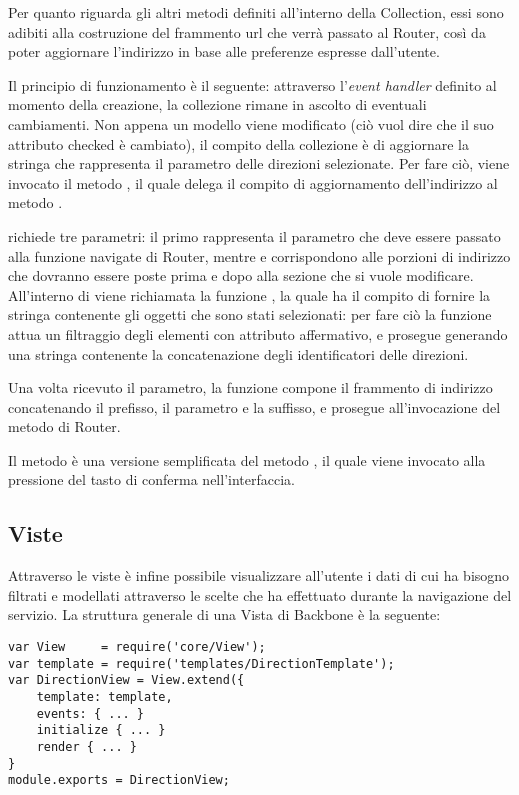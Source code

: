 Per quanto riguarda gli altri metodi definiti all'interno della Collection, essi sono adibiti alla costruzione del frammento url che verrà passato al Router, così da poter aggiornare l'indirizzo in base alle preferenze espresse dall'utente.

Il principio di funzionamento è il seguente: attraverso l'{\itshape event handler} definito al momento della creazione, la collezione rimane in ascolto di eventuali cambiamenti. Non appena un modello viene modificato (ciò vuol dire che il suo attributo checked è cambiato), il compito della collezione è di aggiornare la stringa che rappresenta il parametro delle direzioni selezionate. Per fare ciò, viene invocato il metodo , il quale delega il compito di aggiornamento dell'indirizzo al metodo .

  richiede tre parametri: il primo rappresenta il parametro  che deve essere passato alla funzione navigate di Router, mentre  e  corrispondono alle porzioni di indirizzo che dovranno essere poste prima e dopo alla sezione che si vuole modificare.
 All'interno di  viene richiamata la funzione , la quale ha il compito di fornire la stringa contenente gli oggetti che sono stati selezionati: per fare ciò la funzione attua un filtraggio degli elementi con attributo  affermativo, e prosegue generando una stringa contenente la concatenazione degli identificatori delle direzioni.

 Una volta ricevuto il parametro, la funzione  compone il frammento di indirizzo concatenando il prefisso, il parametro e la suffisso, e prosegue all'invocazione del metodo  di Router.

 Il metodo  è una versione semplificata del metodo , il quale viene invocato alla pressione del tasto di conferma nell'interfaccia. 

\subsection{Viste} %
\label{sub:viste}

Attraverso le viste è infine possibile visualizzare all'utente i dati di cui ha bisogno filtrati e modellati attraverso le scelte che ha effettuato durante la navigazione del servizio.
La struttura generale di una Vista di Backbone è la seguente:
{\small
\begin{verbatim}
var View     = require('core/View');
var template = require('templates/DirectionTemplate');
var DirectionView = View.extend({    
    template: template,
    events: { ... }
    initialize { ... }
    render { ... }
}
module.exports = DirectionView;
\end{verbatim}
}

